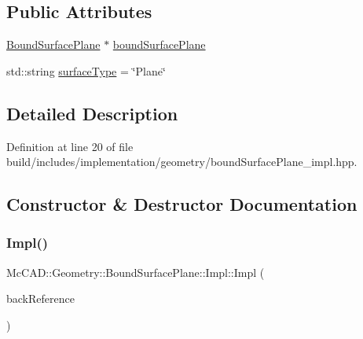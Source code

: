 \subsection*{Public Attributes}
\begin{DoxyCompactItemize}
\item 
\hyperlink{classMcCAD_1_1Geometry_1_1BoundSurfacePlane}{Bound\+Surface\+Plane} $\ast$ \hyperlink{classMcCAD_1_1Geometry_1_1BoundSurfacePlane_1_1Impl_a272076fe54fdd949acb310eece31f498}{bound\+Surface\+Plane}
\item 
std\+::string \hyperlink{classMcCAD_1_1Geometry_1_1BoundSurfacePlane_1_1Impl_affc43d747b9963c91b61c5def9d3d556}{surface\+Type} = \char`\"{}Plane\char`\"{}
\end{DoxyCompactItemize}


\subsection{Detailed Description}


Definition at line 20 of file build/includes/implementation/geometry/bound\+Surface\+Plane\+\_\+impl.\+hpp.



\subsection{Constructor \& Destructor Documentation}
\mbox{\label{classMcCAD_1_1Geometry_1_1BoundSurfacePlane_1_1Impl_a0ee45438392854a18ea011b5f324962f}} 
\subsubsection{\texorpdfstring{Impl()}{Impl()}\hspace{0.1cm}{\footnotesize\ttfamily [1/2]}}
{\footnotesize\ttfamily Mc\+C\+A\+D\+::\+Geometry\+::\+Bound\+Surface\+Plane\+::\+Impl\+::\+Impl (\begin{DoxyParamCaption}\item[{\hyperlink{classMcCAD_1_1Geometry_1_1BoundSurfacePlane}{Bound\+Surface\+Plane} $\ast$}]{back\+Reference }\end{DoxyParamCaption})}



